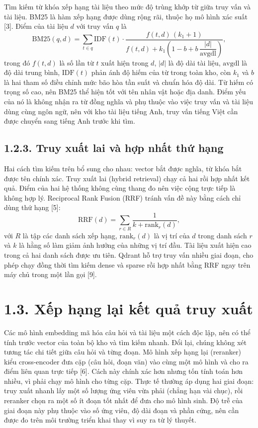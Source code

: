 Tìm kiếm từ khóa xếp hạng tài liệu theo mức độ trùng khớp từ giữa truy vấn và tài liệu. BM25 là hàm xếp hạng được dùng rộng rãi, thuộc họ mô hình xác suất [3]. Điểm của tài liệu $d$ với truy vấn $q$ là
\begin{equation*}
\mathrm{BM25}(q,d)=\sum_{t\in q}\mathrm{IDF}(t)\cdot\frac{f(t,d)\,(k_1+1)}{f(t,d)+k_1\left(1-b+b\,\dfrac{|d|}{\mathrm{avgdl}}\right)},
\end{equation*}
trong đó $f(t,d)$ là số lần từ $t$ xuất hiện trong $d$, $|d|$ là độ dài tài liệu, $\mathrm{avgdl}$ là độ dài trung bình, $\mathrm{IDF}(t)$ phản ánh độ hiếm của từ trong toàn kho, còn $k_1$ và $b$ là hai tham số điều chỉnh mức bão hòa tần suất và chuẩn hóa độ dài. Từ hiếm có trọng số cao, nên BM25 thể hiện tốt với tên nhân vật hoặc địa danh. Điểm yếu của nó là không nhận ra từ đồng nghĩa và phụ thuộc vào việc truy vấn và tài liệu dùng cùng ngôn ngữ, nên với kho tài liệu tiếng Anh, truy vấn tiếng Việt cần được chuyển sang tiếng Anh trước khi tìm.


\subsection{1.2.3. Truy xuất lai và hợp nhất thứ hạng}

Hai cách tìm kiếm trên bổ sung cho nhau: vector bắt được nghĩa, từ khóa bắt được tên chính xác. Truy xuất lai (hybrid retrieval) chạy cả hai rồi hợp nhất kết quả. Điểm của hai hệ thống không cùng thang đo nên việc cộng trực tiếp là không hợp lý. Reciprocal Rank Fusion (RRF) tránh vấn đề này bằng cách chỉ dùng thứ hạng [5]:
\begin{equation*}
\mathrm{RRF}(d)=\sum_{r\in R}\frac{1}{k+\mathrm{rank}_r(d)},
\end{equation*}
với $R$ là tập các danh sách xếp hạng, $\mathrm{rank}_r(d)$ là vị trí của $d$ trong danh sách $r$ và $k$ là hằng số làm giảm ảnh hưởng của những vị trí đầu. Tài liệu xuất hiện cao trong cả hai danh sách được ưu tiên. Qdrant hỗ trợ truy vấn nhiều giai đoạn, cho phép chạy đồng thời tìm kiếm dense và sparse rồi hợp nhất bằng RRF ngay trên máy chủ trong một lần gọi [9].


\section{1.3. Xếp hạng lại kết quả truy xuất}

Các mô hình embedding mã hóa câu hỏi và tài liệu một cách độc lập, nên có thể tính trước vector của toàn bộ kho và tìm kiếm nhanh. Đổi lại, chúng không xét tương tác chi tiết giữa câu hỏi và từng đoạn. Mô hình xếp hạng lại (reranker) kiểu cross-encoder đưa cặp (câu hỏi, đoạn văn) vào cùng một mô hình và cho ra điểm liên quan trực tiếp [6]. Cách này chính xác hơn nhưng tốn tính toán hơn nhiều, vì phải chạy mô hình cho từng cặp. Thực tế thường áp dụng hai giai đoạn: truy xuất nhanh lấy một số lượng ứng viên vừa phải (chẳng hạn vài chục), rồi reranker chọn ra một số ít đoạn tốt nhất để đưa cho mô hình sinh. Độ trễ của giai đoạn này phụ thuộc vào số ứng viên, độ dài đoạn và phần cứng, nên cần được đo trên môi trường triển khai thay vì suy ra từ lý thuyết.


